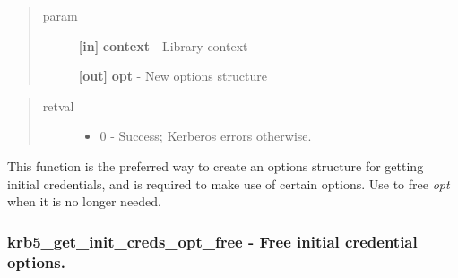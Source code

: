 \documentclass[letterpaper,10pt,english]{sphinxmanual}
\begin{document}
\begin{fulllineitems}
\label{appdev/refs/api/krb5_get_init_creds_opt_alloc:krb5_get_init_creds_opt_alloc}
\end{fulllineitems}

\begin{quote}\begin{description}
\item[{param}] \leavevmode
\textbf{{[}in{]}} \textbf{context} - Library context

\textbf{{[}out{]}} \textbf{opt} - New options structure

\end{description}\end{quote}
\begin{quote}\begin{description}
\item[{retval}] \leavevmode\begin{itemize}
\item {} 
0   - Success; Kerberos errors otherwise.

\end{itemize}

\end{description}\end{quote}

This function is the preferred way to create an options structure for getting initial credentials, and is required to make use of certain options. Use {\hyperref[appdev/refs/api/krb5_get_init_creds_opt_free:krb5_get_init_creds_opt_free]{}} to free \emph{opt} when it is no longer needed.


\subsubsection{krb5\_get\_init\_creds\_opt\_free -  Free initial credential options.}
\label{appdev/refs/api/krb5_get_init_creds_opt_free::doc}\label{appdev/refs/api/krb5_get_init_creds_opt_free:krb5-get-init-creds-opt-free-free-initial-credential-options}
\end{document}
